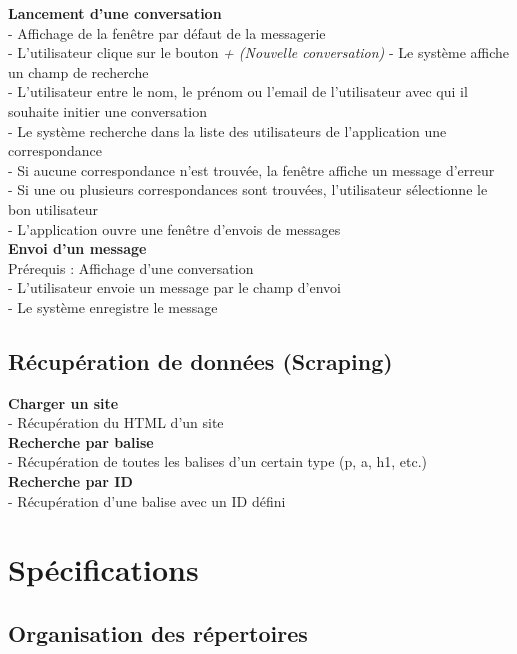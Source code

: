 \documentclass[conference]{IEEEtran}
\begin{document}
\textbf{Lancement d'une conversation}\\
- Affichage de la fenêtre par défaut de la messagerie\\
- L'utilisateur clique sur le bouton \textit{+ (Nouvelle conversation)}
- Le système affiche un champ de recherche\\
- L'utilisateur entre le nom, le prénom ou l'email de l'utilisateur avec qui il souhaite initier une conversation\\
- Le système recherche dans la liste des utilisateurs de l'application une correspondance\\
- Si aucune correspondance n'est trouvée, la fenêtre affiche un message d'erreur\\
- Si une ou plusieurs correspondances sont trouvées, l'utilisateur sélectionne le bon utilisateur\\
- L'application ouvre une fenêtre d'envois de messages\\

\textbf{Envoi d'un message}\\
Prérequis : Affichage d'une conversation\\
- L'utilisateur envoie un message par le champ d'envoi\\
- Le système enregistre le message\\

\subsection{Récupération de données (Scraping)}
\textbf{Charger un site}\\
- Récupération du HTML d'un site\\

\textbf{Recherche par balise}\\
- Récupération de toutes les balises d'un certain type (p, a, h1, etc.)\\

\textbf{Recherche par ID}\\
- Récupération d'une balise avec un ID défini\\

\section{Spécifications}

\subsection{Organisation des répertoires}
\end{document}
